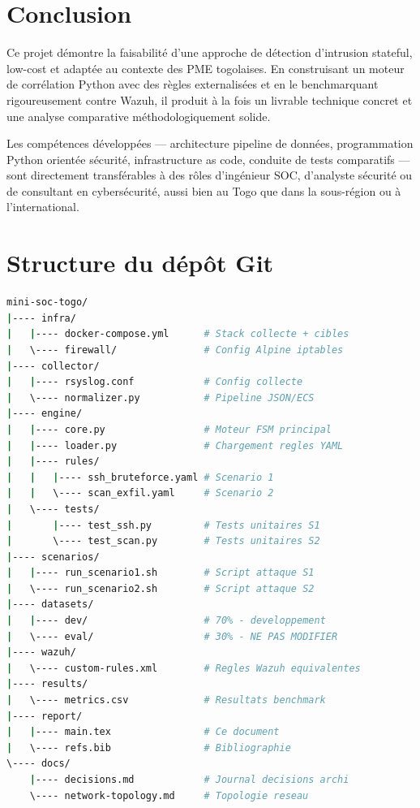 \documentclass[11pt,a4paper]{article}
\begin{document}
\section{Conclusion}

Ce projet démontre la faisabilité d'une approche de détection d'intrusion
stateful, low-cost et adaptée au contexte des PME togolaises.
En construisant un moteur de corrélation Python avec des règles externalisées
et en le benchmarquant rigoureusement contre Wazuh, il produit
à la fois un livrable technique concret et une analyse comparative
méthodologiquement solide.

Les compétences développées — architecture pipeline de données,
programmation Python orientée sécurité, infrastructure as code,
conduite de tests comparatifs — sont directement transférables
à des rôles d'ingénieur SOC, d'analyste sécurité ou de consultant
en cybersécurité, aussi bien au Togo que dans la sous-région
ou à l'international.

\nocite{*}


\newpage
\appendix
\section{Structure du dépôt Git}

\begin{lstlisting}[language=bash, caption={Structure du dépôt mini-soc-togo}]
mini-soc-togo/
|---- infra/
|   |---- docker-compose.yml      # Stack collecte + cibles
|   \---- firewall/               # Config Alpine iptables
|---- collector/
|   |---- rsyslog.conf            # Config collecte
|   \---- normalizer.py           # Pipeline JSON/ECS
|---- engine/
|   |---- core.py                 # Moteur FSM principal
|   |---- loader.py               # Chargement regles YAML
|   |---- rules/
|   |   |---- ssh_bruteforce.yaml # Scenario 1
|   |   \---- scan_exfil.yaml     # Scenario 2
|   \---- tests/
|       |---- test_ssh.py         # Tests unitaires S1
|       \---- test_scan.py        # Tests unitaires S2
|---- scenarios/
|   |---- run_scenario1.sh        # Script attaque S1
|   \---- run_scenario2.sh        # Script attaque S2
|---- datasets/
|   |---- dev/                    # 70% - developpement
|   \---- eval/                   # 30% - NE PAS MODIFIER
|---- wazuh/
|   \---- custom-rules.xml        # Regles Wazuh equivalentes
|---- results/
|   \---- metrics.csv             # Resultats benchmark
|---- report/
|   |---- main.tex                # Ce document
|   \---- refs.bib                # Bibliographie
\---- docs/
    |---- decisions.md            # Journal decisions archi
    \---- network-topology.md     # Topologie reseau
\end{lstlisting}
\end{document}
